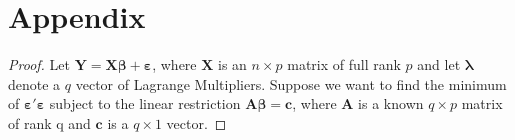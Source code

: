 \documentclass{Vorlage}
\newtheorem{proof}{Proof}
\newcommand{\XX}{\mathbf{X}}
\newcommand{\YY}{\mathbf{Y}}
\newcommand{\bb}{\pmb{\beta}}
\newcommand{\la}{\pmb{\lambda}}
\newcommand{\A}{\mathbf{A}}
\newcommand{\cc}{\mathbf{c}}
\begin{document}
\clearpage

\appendix
\section*{Appendix}

\begin{proof}
Let $\YY = \XX \bb + \pmb{\varepsilon}$, where $\XX$ is an $n \times p$ matrix of full rank $p$ and let $\la$ denote a $q$ vector of Lagrange Multipliers. Suppose we want to find the minimum of $\pmb{\varepsilon}'\pmb{\varepsilon}$ subject to the linear restriction $\A\bb = \cc$, where $\A$ is a known $q \times p$ matrix of rank q and $\cc$ is a $q \times 1$ vector.
\end{proof}
\end{document}
